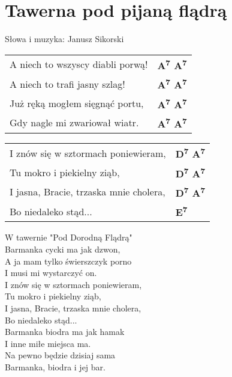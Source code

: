 \section{Tawerna pod pijaną flądrą}

Słowa i muzyka: Janusz Sikorski

\vspace{2em}
\begin{tabular}{@{}p{7cm}@{}l@{}}
A niech to wszyscy diabli porwą! & \bfseries A\textsuperscript{7} A\textsuperscript{7}\\
A niech to trafi jasny szlag! & \bfseries A\textsuperscript{7} A\textsuperscript{7}\\
Już ręką mogłem sięgnąć portu, & \bfseries A\textsuperscript{7} A\textsuperscript{7}\\
Gdy nagle mi zwariował wiatr. & \bfseries A\textsuperscript{7} A\textsuperscript{7}\\
\end{tabular}

\vspace{1em}
\begin{tabular}{@{}p{7cm}@{}l@{}}
I znów się w sztormach poniewieram, & \bfseries D\textsuperscript{7} A\textsuperscript{7}\\
Tu mokro i piekielny ziąb, & \bfseries D\textsuperscript{7} A\textsuperscript{7}\\
I jasna, Bracie, trzaska mnie cholera, & \bfseries D\textsuperscript{7} A\textsuperscript{7}\\
Bo niedaleko stąd... & \bfseries E\textsuperscript{7}\\
\end{tabular}

\vspace{1em}
W tawernie "Pod Dorodną Flądrą" \\
Barmanka cycki ma jak dzwon, \\
A ja mam tylko świerszczyk porno \\
I musi mi wystarczyć on. \\

I znów się w sztormach poniewieram, \\
Tu mokro i piekielny ziąb, \\
I jasna, Bracie, trzaska mnie cholera, \\
Bo niedaleko stąd... \\

Barmanka biodra ma jak hamak \\
I inne miłe miejsca ma. \\
Na pewno będzie dzisiaj sama \\
Barmanka, biodra i jej bar. \\

